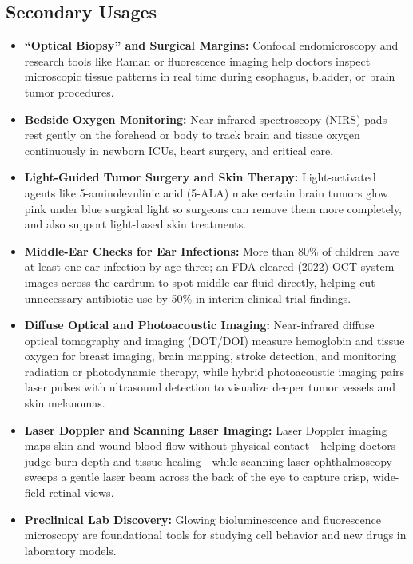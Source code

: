 \subsection{Secondary Usages}
\begin{itemize}
  \item \textbf{``Optical Biopsy'' and Surgical Margins:} Confocal endomicroscopy and research tools like Raman or fluorescence imaging help doctors inspect microscopic tissue patterns in real time during esophagus, bladder, or brain tumor procedures.
  \item \textbf{Bedside Oxygen Monitoring:} Near-infrared spectroscopy (NIRS) pads rest gently on the forehead or body to track brain and tissue oxygen continuously in newborn ICUs, heart surgery, and critical care.
  \item \textbf{Light-Guided Tumor Surgery and Skin Therapy:} Light-activated agents like 5-aminolevulinic acid (5-ALA) make certain brain tumors glow pink under blue surgical light so surgeons can remove them more completely, and also support light-based skin treatments.
  \item \textbf{Middle-Ear Checks for Ear Infections:} More than 80\% of children have at least one ear infection by age three; an FDA-cleared (2022) OCT system images across the eardrum to spot middle-ear fluid directly, helping cut unnecessary antibiotic use by 50\% in interim clinical trial findings.
  \item \textbf{Diffuse Optical and Photoacoustic Imaging:} Near-infrared diffuse optical tomography and imaging (DOT/DOI) measure hemoglobin and tissue oxygen for breast imaging, brain mapping, stroke detection, and monitoring radiation or photodynamic therapy, while hybrid photoacoustic imaging pairs laser pulses with ultrasound detection to visualize deeper tumor vessels and skin melanomas.
  \item \textbf{Laser Doppler and Scanning Laser Imaging:} Laser Doppler imaging maps skin and wound blood flow without physical contact---helping doctors judge burn depth and tissue healing---while scanning laser ophthalmoscopy sweeps a gentle laser beam across the back of the eye to capture crisp, wide-field retinal views.
  \item \textbf{Preclinical Lab Discovery:} Glowing bioluminescence and fluorescence microscopy are foundational tools for studying cell behavior and new drugs in laboratory models.
\end{itemize}

